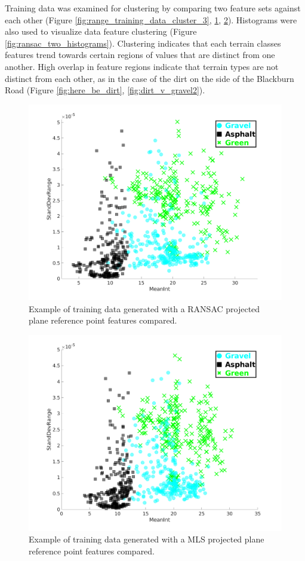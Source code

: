 \documentclass[numbered,pdftex]{ohio-etd}
\begin{document}
{{{		{Training data was examined for clustering by comparing two feature sets against each other (Figure \ref{fig:range_training_data_cluster_3}, \ref{fig:ransac_training_data_cluster}, \ref{fig:mls_training_data_cluster}). Histograms were also used to visualize data feature clustering (Figure \ref{fig:ransac_two_histograms}). Clustering indicates that each terrain classes features trend towards certain regions of values that are distinct from one another. High overlap in feature regions indicate that terrain types are not distinct from each other, as in the case of the dirt on the side of the Blackburn Road (Figure \ref{fig:here_be_dirt}, \ref{fig:dirt_v_gravel2}). }
		
		\begin{figure}[H]
			\centering
			\includegraphics[width=0.65\linewidth]{Defense_Images/ransac_training_data_cluster}
			\caption[Example RANSAC Clustering]{Example of training data generated with a RANSAC projected plane reference point features compared.}
			\label{fig:ransac_training_data_cluster}
		\end{figure}
	
		\begin{figure}[H]
			\centering
			\includegraphics[width=0.65\linewidth]{Defense_Images/mls_training_data_cluster}
			\caption[Example MLS Clustering]{Example of training data generated with a MLS projected plane reference point features compared.}
			\label{fig:mls_training_data_cluster}
		\end{figure}
	
}}}
\end{document}
